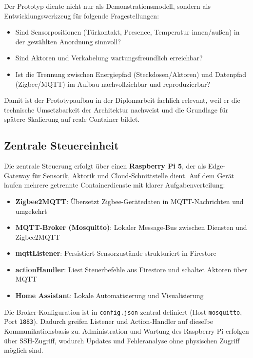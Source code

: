 Der Prototyp diente nicht nur als Demonstrationsmodell, sondern als Entwicklungswerkzeug für folgende Fragestellungen:

\begin{itemize}
    \item Sind Sensorpositionen (Türkontakt, Presence, Temperatur innen/außen) in der gewählten Anordnung sinnvoll?
    \item Sind Aktoren und Verkabelung wartungsfreundlich erreichbar?
    \item Ist die Trennung zwischen Energiepfad (Steckdosen/Aktoren) und Datenpfad (Zigbee/MQTT) im Aufbau nachvollziehbar und reproduzierbar?
\end{itemize}

Damit ist der Prototypaufbau in der Diplomarbeit fachlich relevant, weil er die technische Umsetzbarkeit der Architektur nachweist und die Grundlage für spätere Skalierung auf reale Container bildet.

\subsection{Zentrale Steuereinheit}

Die zentrale Steuerung erfolgt über einen \textbf{Raspberry Pi 5}, der als Edge-Gateway für Sensorik, Aktorik und Cloud-Schnittstelle dient. Auf dem Gerät laufen mehrere getrennte Containerdienste mit klarer Aufgabenverteilung:

\begin{itemize}
    \item \textbf{Zigbee2MQTT}: Übersetzt Zigbee-Gerätedaten in MQTT-Nachrichten und umgekehrt
    \item \textbf{MQTT-Broker (Mosquitto)}: Lokaler Message-Bus zwischen Diensten und Zigbee2MQTT
    \item \textbf{mqttListener}: Persistiert Sensorzustände strukturiert in Firestore
    \item \textbf{actionHandler}: Liest Steuerbefehle aus Firestore und schaltet Aktoren über MQTT
    \item \textbf{Home Assistant}: Lokale Automatisierung und Visualisierung
\end{itemize}

Die Broker-Konfiguration ist in \texttt{config.json} zentral definiert (Host \texttt{mosquitto}, Port \texttt{1883}). Dadurch greifen Listener und Action-Handler auf dieselbe Kommunikationsbasis zu. Administration und Wartung des Raspberry Pi erfolgen über SSH-Zugriff, wodurch Updates und Fehleranalyse ohne physischen Zugriff möglich sind.

